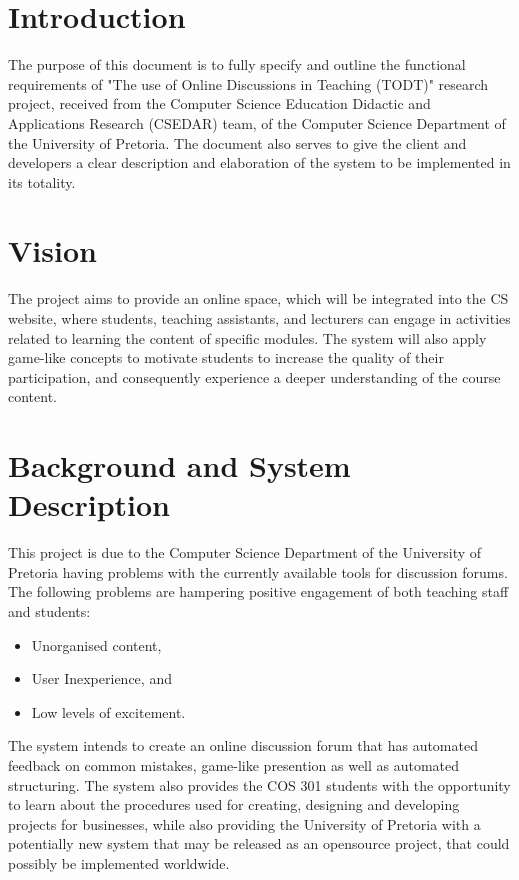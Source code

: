 \documentclass[11pt]{article}
\begin{document}


\tableofcontents	%
\newpage

\listoffigures		%

\newpage


\section{Introduction}

The purpose of this document is to fully specify and outline the functional requirements of "The use of Online Discussions in Teaching (TODT)" research project, received from the Computer Science Education Didactic and Applications Research (CSEDAR) team, of the Computer Science Department of the University of Pretoria. The document also serves to give the client and developers a clear description and elaboration of the system to be implemented in its totality.

\section{Vision}

The project aims to provide an online space, which will be integrated into the CS website, where students, teaching assistants, and lecturers can engage in activities related to learning the content of specific modules. The system will also apply game-like concepts to motivate students to increase the quality of their participation, and consequently experience a deeper understanding of the course content.

\section{Background and System Description}

This project is due to the Computer Science Department of the University of Pretoria having problems with the currently available tools for discussion forums. The following problems are hampering positive engagement of both teaching staff and students:
\begin{itemize}
\item Unorganised content,
\item User Inexperience, and 
\item Low levels of excitement.
\end{itemize}
The system intends to create an online discussion forum that has automated feedback on common mistakes, game-like presention as well as automated structuring. \newline
The system also provides the COS 301 students with the opportunity to learn about the procedures used for creating, designing and developing projects for businesses, while also providing the University of Pretoria with a potentially new system that may be released as an opensource project, that could possibly be implemented worldwide.
\end{document}
